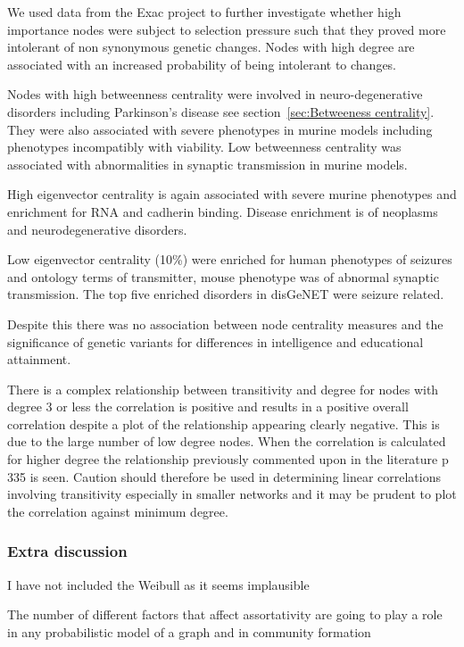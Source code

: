 We used data from the Exac project to further investigate whether high importance nodes were subject to selection pressure such that they proved more intolerant of non synonymous genetic changes. Nodes with high degree are associated with an increased probability of being intolerant to changes. 

Nodes with high betweenness centrality were involved in neuro-degenerative disorders including Parkinson's disease see section~\ref{sec:Betweeness centrality}. They were also associated with severe phenotypes in murine models including phenotypes incompatibly with viability. Low betweenness centrality was associated with abnormalities in synaptic transmission in murine models. 

High eigenvector centrality is again associated with severe murine phenotypes and enrichment for RNA and cadherin binding. Disease enrichment is of neoplasms and neurodegenerative disorders. 

Low eigenvector centrality (10\%) were enriched for human phenotypes of seizures and ontology terms of transmitter, mouse phenotype was of abnormal synaptic transmission. The top five enriched disorders in disGeNET were seizure related. 

Despite this there was no association between node centrality measures and the significance of genetic variants for differences in intelligence and educational attainment.

There is a complex relationship between transitivity and degree for nodes with degree 3 or less the correlation is positive and results in a positive overall correlation despite a plot of the relationship appearing clearly negative. This is due to the large number of low degree nodes. When the correlation is calculated for higher degree the relationship previously commented upon in the literature \cite{newman} p 335 is seen. Caution should therefore be used in determining linear correlations involving transitivity especially in smaller networks and it may be prudent to plot the correlation against minimum degree.


\subsubsection{Extra discussion}

I have not included the Weibull as it seems implausible

The number of different factors that affect assortativity are going to play a role in any probabilistic model of a graph and in community formation

